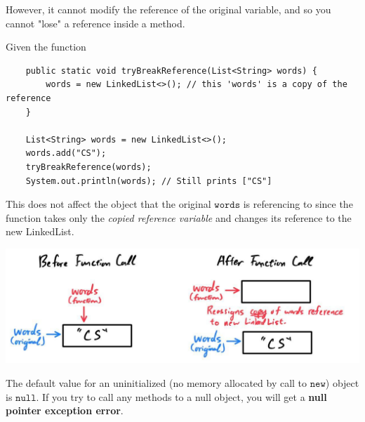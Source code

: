 \documentclass{article}
\begin{document}
    However, it cannot modify the reference of the original variable, and so you cannot "lose" a reference inside a method.  

    \begin{example}
    Given the function 
    \begin{lstlisting}
    public static void tryBreakReference(List<String> words) {
        words = new LinkedList<>(); // this 'words' is a copy of the reference 
    }

    List<String> words = new LinkedList<>(); 
    words.add("CS"); 
    tryBreakReference(words); 
    System.out.println(words); // Still prints ["CS"]
    \end{lstlisting}
    This does not affect the object that the original $\texttt{words}$ is referencing to since the function takes only the \textit{copied reference variable} and changes its reference to the new LinkedList. 
    \begin{center}
        \includegraphics[scale=0.3]{img/func_ref_example2.jpg}
    \end{center}
    \end{example}

    The default value for an uninitialized (no memory allocated by call to $\texttt{new}$) object is $\texttt{null}$. If you try to call any methods to a null object, you will get a \textbf{null pointer exception error}. 
\end{document}
